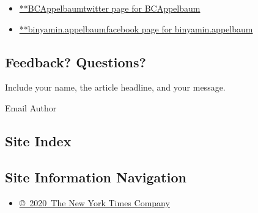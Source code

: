\begin{itemize}
\tightlist
\item
  \href{https://twitter.com/BCAppelbaum}{**BCAppelbaumtwitter page for
  BCAppelbaum}
\item
  \href{https://www.facebookcorewwwi.onion/binyamin.appelbaum}{**binyamin.appelbaumfacebook
  page for binyamin.appelbaum}
\end{itemize}

\hypertarget{feedback-questions}{%
\subsection{Feedback? Questions?}\label{feedback-questions}}

Include your name, the article headline, and your message.

Email Author

\hypertarget{site-index}{%
\subsection{Site Index}\label{site-index}}

\hypertarget{site-information-navigation}{%
\subsection{Site Information
Navigation}\label{site-information-navigation}}

\begin{itemize}
\tightlist
\item
  \href{https://help.nytimes3xbfgragh.onion/hc/en-us/articles/115014792127-Copyright-notice}{©~2020~The
  New York Times Company}
\end{itemize}

